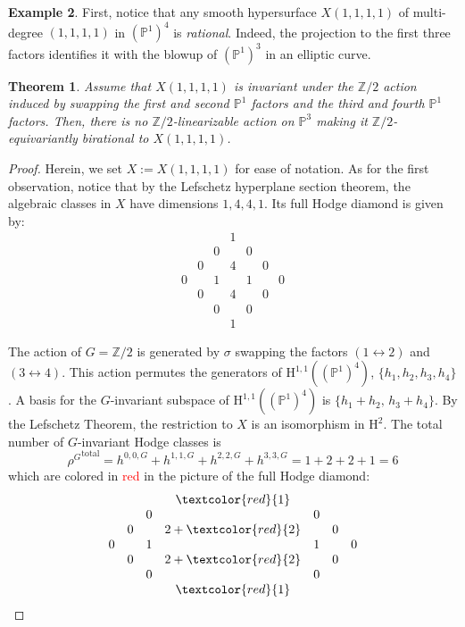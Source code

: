 \documentclass[12pt,a4paper]{amsart}
\newtheorem{theorem}{Theorem}[section]
\theoremstyle{definition}
\newtheorem{example}[theorem]{Example}
\theoremstyle{remark}
\begin{document}
\begin{example}
\label{ex:X(1,1,1,1)}
First, notice that any smooth hypersurface $X(1,1,1,1)$ of multi-degree $(1,1,1,1)$ in
\((\mathbb{P}^1)^4\) is \emph{rational}. Indeed, the projection to the first three factors identifies it with the blowup of  \((\mathbb{P}^1)^3\) in an elliptic curve. 

\begin{theorem}\label{thm:X(1,1,1,1)-withZ_2}
Assume that \( X(1,1,1,1) \) is invariant under the \(\mathbb Z/2\) action induced by swapping the first and second \(\mathbb{P}^1\) factors and the third and fourth \(\mathbb{P}^1\) factors. Then, there is no \(\mathbb Z/2\)-linearizable action on \(\mathbb{P}^3\) making it \(\mathbb Z/2\)-equivariantly birational to \( X(1,1,1,1) \).
\end{theorem}
\begin{proof}
Herein, we set $X:=X(1,1,1,1)$ for ease of notation. As for the first observation, notice that by the Lefschetz hyperplane section theorem, the algebraic classes in $X$ have dimensions $1, 4, 4, 1$. Its full Hodge diamond is given by:
 \[
\begin{array}{ccccccc}
  &&& 1 &&& \\
  && 0 && 0 && \\
  & 0 && 4 && 0 &\\
  0 && 1 && 1 && 0\\
  & 0 && 4 && 0 &\\
  && 0 && 0 && \\
  &&& 1 &&&
\end{array}
\]

The action of $G=\mathbb{Z}/2$ is generated by $\sigma$ swapping the factors $(1\leftrightarrow 2)$ and $(3\leftrightarrow 4)$. This action permutes the generators of $\mathrm{H}^{1,1}((\mathbb P^1)^4)$, $\{h_1,h_2,h_3,h_4\}$. A basis for the $G$-invariant subspace of $\mathrm{H}^{1,1}((\mathbb P^1)^4)$ is $\{h_1+h_2,\,h_3+h_4\}$. By the Lefschetz Theorem, the restriction to $X$ is an isomorphism in $\mathrm{H}^2$. The total number of $G$-invariant Hodge classes is
\[
{\rho^G}^{\mathrm{total}}=h^{0,0,G}+h^{1,1,G}+h^{2,2,G}+h^{3,3,G}=1+2+2+1=6
\]
which are colored in \textcolor{red}{red} in the picture of the full Hodge diamond:
\begin{equation}
    \begin{array}{ccccccc}
  &&& \textcolor{red}{1} &&& \\ 
  && 0 && 0 && \\
  & 0 && 2+\textcolor{red}{2} && 0 &\\
  0 && 1 && 1 && 0\\
  & 0 && 2+\textcolor{red}{2} && 0 &\\
  && 0 && 0 && \\
  &&& \textcolor{red}{1} &&&
\end{array}
\end{equation}



\end{proof}
\end{example}
\end{document}
